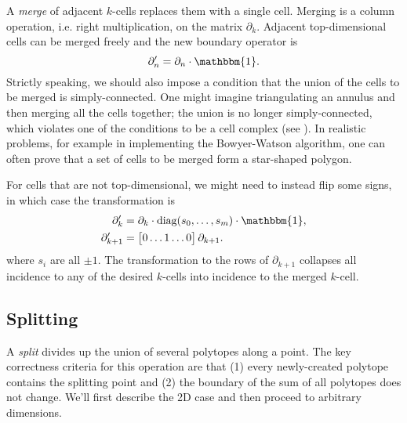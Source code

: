 \documentclass[twocolumn]{article}
\begin{document}
A \emph{merge} of adjacent $k$-cells replaces them with a single cell.
Merging is a column operation, i.e. right multiplication, on the matrix $\partial_k$.
Adjacent top-dimensional cells can be merged freely and the new boundary operator is
\begin{equation}
    \partial_n' = \partial_n\cdot\mathbbm{1}.
\end{equation}
Strictly speaking, we should also impose a condition that the union of the cells to be merged is simply-connected.
One might imagine triangulating an annulus and then merging all the cells together; the union is no longer simply-connected, which violates one of the conditions to be a cell complex (see \cite{hatcher2002algebraic}).
In realistic problems, for example in implementing the Bowyer-Watson algorithm, one can often prove that a set of cells to be merged form a star-shaped polygon.

For cells that are not top-dimensional, we might need to instead flip some signs, in which case the transformation is
\begin{align}
    \partial_k' & = \partial_k\cdot\text{diag}(s_0, \ldots, s_m)\cdot\mathbbm{1}, \\
    \partial_{k + 1}' & = \left[\begin{matrix} 0 \ldots 1 \ldots 0\end{matrix}\right]\partial_{k + 1}.
\end{align}
where $s_i$ are all $\pm 1$.
The transformation to the rows of $\partial_{k + 1}$ collapses all incidence to any of the desired $k$-cells into incidence to the merged $k$-cell.

\subsection{Splitting}

A \emph{split} divides up the union of several polytopes along a point.
The key correctness criteria for this operation are that (1) every newly-created polytope contains the splitting point and (2) the boundary of the sum of all polytopes does not change.
We'll first describe the 2D case and then proceed to arbitrary dimensions.
\end{document}
